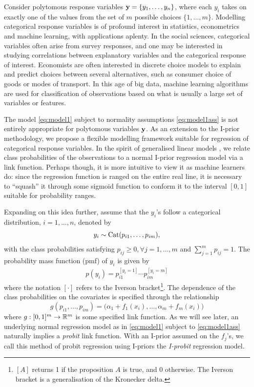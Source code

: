 \documentclass[a4paper,showframe,11pt]{report}
\begin{document}
\label{chapter5}

Consider polytomous response variables ${\mathbf y} = \{y_1,\dots,y_n\}$, where each $y_i$ takes on exactly one of the values from the set of $m$ possible choices $\{1,\dots,m\}$.
Modelling categorical response variables is of profound interest in statistics, econometrics and machine learning, with applications aplenty. 
In the social sciences, categorical variables often arise from survey responses, and one may be interested in studying correlations between  explanatory variables and the categorical response of interest.
Economists are often interested in discrete choice models to explain and predict choices between several alternatives, such as consumer choice of goods or modes of transport.
In this age of big data, machine learning algorithms are used for classification of observations based on what is usually a large set of variables or features.

The model \cref{eq:model1} subject to normality assumptions \cref{eq:model1ass} is not entirely appropriate for polytomous variables ${\mathbf y}$.
As an extension to the I-prior methodology, we propose a flexible modelling framework suitable for regression of categorical response variables.
In the spirit of generalised linear models \citep{mccullagh1989}, we relate class probabilities of the observations to a normal I-prior regression model via a link function.
Perhaps though, it is more intuitive to view it as machine learners do: since the regression function is ranged on the entire real line, it is necessary to ``squash'' it through some sigmoid function to conform it to the interval $[0,1]$ suitable for probability ranges.

Expanding on this idea further, assume that the $y_i$'s follow a categorical distribution, $i=1,\dots,n$, denoted by
\[
  y_i \sim \operatorname{Cat}(p_{i1},\dots,p_{im}),
\]
with the class probabilities satisfying $p_{ij} \geq 0, \forall j=1,\dots,m$ and $\sum_{j=1}^m p_{ij} = 1$. 
The probability mass function (pmf) of $y_i$ is given by
\begin{align*}%
  p(y_i) = p_{i1}^{[y_i = 1]} \cdots p_{im}^{[y_i = m]}
\end{align*}
where the notation $[\cdot]$ refers to the Iverson bracket\footnote{$[A]$ returns 1 if the proposition $A$ is true, and 0 otherwise. The Iverson bracket is a generalisation of the Kronecker delta.}. 
The dependence of the class probabilities on the covariates is specified through the relationship
\[
  g(p_{i1},\dots,p_{im}) = \big(\alpha_1 + f_1(x_i), \dots, \alpha_m + f_m(x_i)\big)
\]
where $g:[0,1]^m\to\mathbb{R}^m$ is some specified link function.
As we will see later, an underlying normal regression model as in \cref{eq:model1} subject to \cref{eq:model1ass} naturally implies a \emph{probit} link function.
With an I-prior assumed on the $f_j$'s, we call this method of probit regression using I-priors the \emph{I-probit} regression model.
\end{document}
